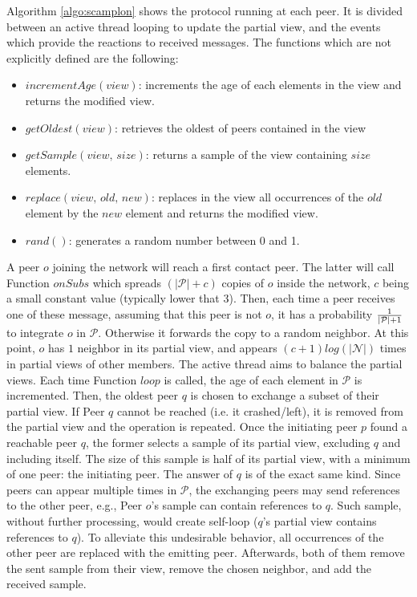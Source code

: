 \begin{asparadesc}
\item [Algorithm]\ref{algo:scamplon} shows the \SCAMPLON{} protocol running at
  each peer. It is divided between an active thread looping to update the
  partial view, and the events which provide the reactions to received
  messages. The functions which are not explicitly defined are the following:
  \begin{itemize}
  \item $incrementAge(view)$: increments the age of each elements in the view
    and returns the modified view.
  \item $getOldest(view)$: retrieves the oldest of peers contained in the view
  \item $getSample(view, \, size)$: returns a sample of the view containing
    $size$ elements.
  \item $replace(view,\,old,\,new)$: replaces in the view all occurrences of
    the $old$ element by the $new$ element and returns the modified view.
  \item $rand()$: generates a random number between 0 and 1.
  \end{itemize}
  A peer $o$ joining the network will reach a first contact peer. The latter
  will call Function $onSubs$ which spreads $(|\mathcal{P}|+c)$ copies of $o$
  inside the network, $c$ being a small constant value (typically lower that
  $3$). Then, each time a peer receives one of these message, assuming that
  this peer is not $o$, it has a probability $1\over{|\mathcal{P}|+1}$ to
  integrate $o$ in $\mathcal{P}$. Otherwise it forwards the copy to a random
  neighbor.  At this point, $o$ has $1$ neighbor in its partial view, and
  appears $(c+1)log(|\mathcal{N}|)$ times in partial views of other
  members. The active thread aims to balance the partial views. Each time
  Function $loop$ is called, the age of each element in $\mathcal{P}$ is
  incremented. Then, the oldest peer $q$ is chosen to exchange a subset of
  their partial view. If Peer $q$ cannot be reached (i.e. it crashed/left), it
  is removed from the partial view and the operation is repeated. Once the
  initiating peer $p$ found a reachable peer $q$, the former selects a sample
  of its partial view, excluding $q$ and including itself. The size of this
  sample is half of its partial view, with a minimum of one peer: the
  initiating peer. The answer of $q$ is of the exact same kind. Since peers can
  appear multiple times in $\mathcal{P}$, the exchanging peers may send
  references to the other peer, e.g., Peer $o$'s sample can contain references
  to $q$. Such sample, without further processing, would create self-loop
  ($q$'s partial view contains references to $q$). To alleviate this
  undesirable behavior, all occurrences of the other peer are replaced with the
  emitting peer.  Afterwards, both of them remove the sent sample from their
  view, remove the chosen neighbor, and add the received sample.
\end{asparadesc}

